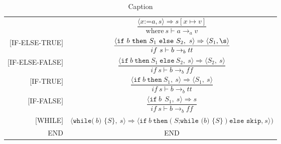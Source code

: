 \begin{table}[H]
    \centering
    \begin{longtable}[c] { r c }
        \hline
        [ASS1] & \( \dfrac{\langle x \texttt{:=} a, s \rangle \Rightarrow s[x \mapsto v]}{\text{where} \ s \vdash a\rightarrow_a v} \) \\
        
        
        [IF-ELSE-TRUE] & \( \dfrac{\langle \texttt{if} \ b \ \texttt{then} \ S_1 \ \texttt{else} \ S_2,\ s \rangle \Rightarrow \langle S_1,\s\rangle}{if\ s\vdash b \rightarrow_b tt} \) \\
        
        [IF-ELSE-FALSE] & \( \dfrac{\langle \texttt{if} \ b \ \texttt{then} \ S_1 \ \texttt{else} \ S_2,\ s \rangle \Rightarrow \langle S_2,\ s \rangle}{if\ s\vdash b \rightarrow_b ff} \) \\
        
        [IF-TRUE] & \( \dfrac{\langle \texttt{if} \ b \ \texttt{then} \ S_1,\ s \rangle \Rightarrow \langle S_1,\ s \rangle}{if \ s\vdash b \rightarrow_b tt} \) \\
        
        [IF-FALSE] & \( \dfrac{\langle \texttt{if} \ b \ \texttt \ S_1,\ s \rangle \Rightarrow s}{if\ s\vdash b \rightarrow_b ff} \) \\
        
        [WHILE] & \( \langle \texttt{while(} \ b\texttt{) \{} S \texttt{\}},\ s \rangle \Rightarrow \langle \texttt{if} \ b \ \texttt{then} (S\texttt{;while (} b \texttt{) \{} S\texttt{\}}) \texttt{else skip,}\ s\rangle) \) \\
        
        END & END\\
        \hline
    \end{longtable}
    \caption{Caption}\label{tab:my_label}
\end{table}